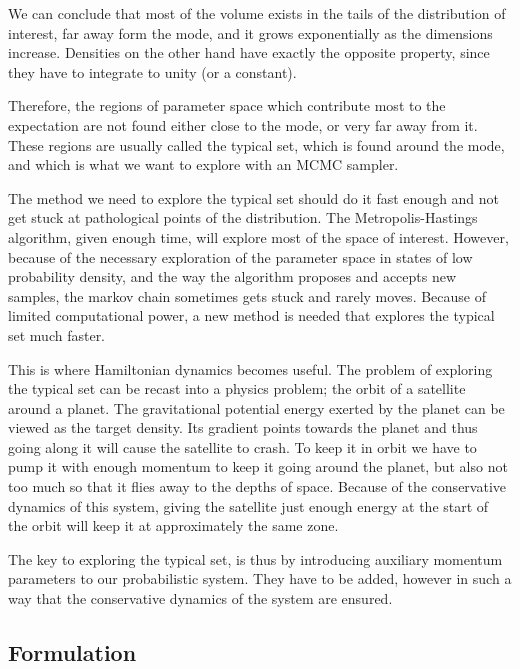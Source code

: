 We can conclude that most of the volume exists in the tails of the distribution of interest, far away form the mode, and it grows exponentially as the dimensions increase. Densities on the other hand have exactly the opposite property, since they have to integrate to unity (or a constant). 


Therefore, the regions of parameter space which contribute most to the expectation are not found either close to the mode, or very far away from it. These regions are usually called the typical set, which is found around the mode, and which is what we want to explore with an MCMC sampler. 


The method we need to explore the typical set should do it fast enough and not get stuck at pathological points of the distribution. The Metropolis-Hastings algorithm, given enough time, will explore most of the space of interest. However, because of the necessary exploration of the parameter space in states of low probability density, and the way the algorithm proposes and accepts new samples, the markov chain sometimes gets stuck and rarely moves. Because of limited computational power, a new method is needed that explores the typical set much faster.

This is where Hamiltonian dynamics becomes useful. The problem of exploring the typical set can be recast into a physics problem; the orbit of a satellite around a planet. The gravitational potential energy exerted by the planet can be viewed as the target density. Its gradient points towards the planet and thus going along it will cause the satellite to crash. To keep it in orbit we have to pump it with enough momentum to keep it going around the planet, but also not too much so that it flies away to the depths of space. Because of the conservative dynamics of this system, giving the satellite just enough energy at the start of the orbit will keep it at approximately the same zone.

The key to exploring the typical set, is thus by introducing auxiliary momentum parameters to our probabilistic system. They have to be added, however in such a way that the conservative dynamics of the system are ensured.

\subsection{Formulation}

